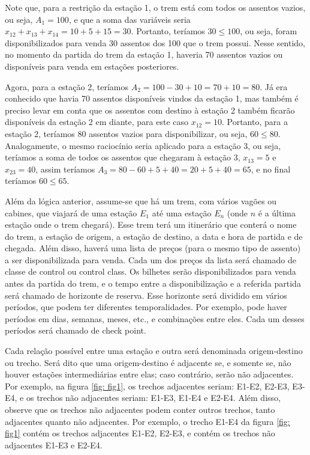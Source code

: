 Note que, para a restrição da estação 1, o trem está com todos os assentos vazios, ou seja, \(A_1=100\), e que a soma das variáveis seria \(x_{12} + x_{13} + x_{14} = 10 + 5 + 15 = 30\). Portanto, teríamos \(30 \leq 100\), ou seja, foram disponibilizados para venda 30 assentos dos 100 que o trem possui. Nesse sentido, no momento da partida do trem da estação 1, haveria 70 assentos vazios ou disponíveis para venda em estações posteriores.

Agora, para a estação 2, teríamos \(A_2 = 100 - 30 + 10 = 70 + 10 = 80\). Já era conhecido que havia 70 assentos disponíveis vindos da estação 1, mas também é preciso levar em conta que os assentos com destino à estação 2 também ficarão disponíveis da estação 2 em diante, para este caso \(x_{12} = 10\). Portanto, para a estação 2, teríamos 80 assentos vazios para disponibilizar, ou seja, \(60 \leq 80\). Analogamente, o mesmo raciocínio seria aplicado para a estação 3, ou seja, teríamos a soma de todos os assentos que chegaram à estação 3, \(x_{13} = 5\) e \(x_{23} = 40\), assim teríamos \(A_3 = 80 - 60 + 5 + 40 = 20 + 5 + 40 = 65\), e no final teríamos \(60 \leq 65\).

Além da lógica anterior, assume-se que há um trem, com vários vagões ou cabines, que viajará de uma estação $E_1$ até uma estação $E_n$ (onde $n$ é a última estação onde o trem chegará). Esse trem terá um itinerário que conterá o nome do trem, a estação de origem, a estação de destino, a data e hora de partida e de chegada. Além disso, haverá uma lista de preços (para o mesmo tipo de assento) a ser disponibilizada para venda. Cada um dos preços da lista será chamado de classe de control ou control class. Os bilhetes serão disponibilizados para venda antes da partida do trem, e o tempo entre a disponibilização e a referida partida será chamado de horizonte de reserva. Esse horizonte será dividido em vários períodos, que podem ter diferentes temporalidades. Por exemplo, pode haver períodos em dias, semanas, meses, etc., e combinações entre eles. Cada um desses períodos será chamado de check point.

Cada relação possível entre uma estação e outra será denominada origem-destino ou trecho. Será dito que uma origem-destino é adjacente se, e somente se, não houver estações intermediárias entre elas; caso contrário, serão não adjacentes. Por exemplo, na figura \ref{fig: fig1}, os trechos adjacentes seriam: E1-E2, E2-E3, E3-E4, e os trechos não adjacentes seriam: E1-E3, E1-E4 e E2-E4. Além disso, observe que os trechos não adjacentes podem conter outros trechos, tanto adjacentes quanto não adjacentes. Por exemplo, o trecho E1-E4 da figura \ref{fig: fig1} contém os trechos adjacentes E1-E2, E2-E3, e contém os trechos não adjacentes E1-E3 e E2-E4.

